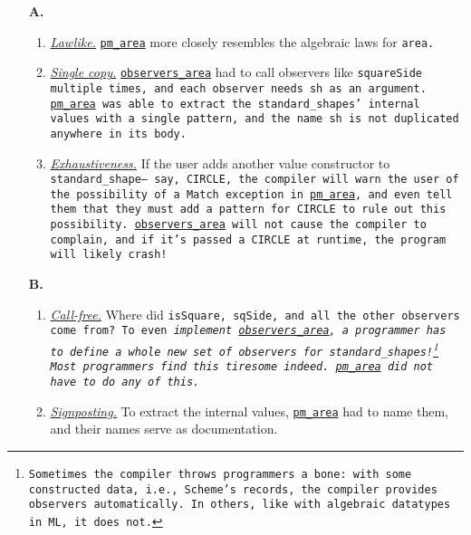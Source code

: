 \documentclass[manuscript,screen,review, 12pt, nonacm]{acmart}
\begin{document}
    \begin{enumerate}
      \item [\textbf{A.}]
      \begin{enumerate}[label=\arabic*]
        \item \hyperref[p1]{\it{Lawlike.}}
        \hyperref[fig:pmarea]{\tt{pm\_area}} more closely resembles the
        algebraic laws for \tt{area}. 
        \item \hyperref[p2]{\it{Single copy.}}
        \hyperref[fig:observersarea]{\tt{observers\_area}} had to call observers
        like \tt{squareSide} multiple times, and each observer needs \tt{sh} as
        an argument. \hyperref[fig:pmarea]{\tt{pm\_area}} was able to extract
        the \tt{standard\_shape}s' internal values with a single pattern, and
        the name \tt{sh} is not duplicated anywhere in its body. 
        \item \hyperref[p5]{\it{Exhaustiveness.}} 
        If the user adds another value
        constructor to \tt{standard\_shape}--- say, \tt{CIRCLE}, the compiler
        will warn the user of the possibility of a \tt{Match} exception in
        \hyperref[fig:pmarea]{\tt{pm\_area}}, and even tell them that they must
        add a pattern for \tt{CIRCLE} to rule out this possibility.
        \hyperref[fig:observersarea]{\tt{observers\_area}} will not cause the
        compiler to complain, and if it's passed a \tt{CIRCLE} at runtime, the
        program will likely crash! 
    \end{enumerate}
      
    \item [\textbf{B.}]
      \begin{enumerate}[start=4, label=\arabic*]
        \item \hyperref[p3]{\it{Call-free.}} 
        Where did \tt{isSquare},
        \tt{sqSide}, and all the other observers come from? To even
        \it{implement} \hyperref[fig:observersarea]{\tt{observers\_area}}, a
        programmer has to define a whole new set of observers for
        \tt{standard\_shape}s!\footnote{Sometimes the compiler throws
        programmers a bone: with some constructed data, i.e., Scheme's records,
        the compiler provides observers automatically. In others, like with
        algebraic datatypes in ML, it does not.} Most programmers find this
        tiresome indeed. \hyperref[fig:pmarea]{\tt{pm\_area}} did not have to do
        any of this.
        \item \hyperref[p4]{\it{Signposting.}} 
        To extract the internal values,
        \hyperref[fig:pmarea]{\tt{pm\_area}} had to name them, and their names
        serve as documentation. 
      \end{enumerate}
    \end{enumerate}
\end{document}
